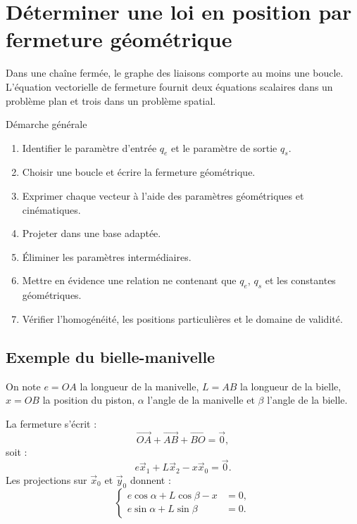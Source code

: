 \section{Déterminer une loi en position par fermeture géométrique}
\label{sec:les-fermeture}

Dans une chaîne fermée, le graphe des liaisons comporte au moins une
boucle. L'équation vectorielle de fermeture fournit deux équations
scalaires dans un problème plan et trois dans un problème spatial.

\begin{TLThreeMethod}{Démarche générale}
\begin{enumerate}
  \item Identifier le paramètre d'entrée $q_e$ et le paramètre de sortie $q_s$.
  \item Choisir une boucle et écrire la fermeture géométrique.
  \item Exprimer chaque vecteur à l'aide des paramètres géométriques et cinématiques.
  \item Projeter dans une base adaptée.
  \item Éliminer les paramètres intermédiaires.
  \item Mettre en évidence une relation ne contenant que $q_e$, $q_s$ et les constantes géométriques.
  \item Vérifier l'homogénéité, les positions particulières et le domaine de validité.
\end{enumerate}
\end{TLThreeMethod}

\subsection{Exemple du bielle-manivelle}

On note $e=OA$ la longueur de la manivelle, $L=AB$ la longueur de la
bielle, $x=OB$ la position du piston, $\alpha$ l'angle de la manivelle et
$\beta$ l'angle de la bielle.

\TLBielleManivelleGeometry

La fermeture s'écrit :
\[
\overrightarrow{OA}+\overrightarrow{AB}+\overrightarrow{BO}=\vec0,
\]
soit :
\[
e\vec x_1+L\vec x_2-x\vec x_0=\vec0.
\]
Les projections sur $\vec x_0$ et $\vec y_0$ donnent :
\[
\left\{\begin{aligned}
e\cos\alpha+L\cos\beta-x&=0,\\
e\sin\alpha+L\sin\beta&=0.
\end{aligned}\right.
\]

